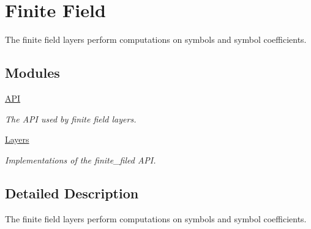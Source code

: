 \hypertarget{group__finite__field}{\section{Finite Field}
\label{group__finite__field}
}


The finite field layers perform computations on symbols and symbol coefficients.  


\subsection*{Modules}
\begin{DoxyCompactItemize}
\item 
\hyperlink{group__finite__field__api}{A\-P\-I}
\begin{DoxyCompactList}\small\item\em The A\-P\-I used by finite field layers. \end{DoxyCompactList}\item 
\hyperlink{group__finite__field__layers}{Layers}
\begin{DoxyCompactList}\small\item\em Implementations of the finite\-\_\-filed A\-P\-I. \end{DoxyCompactList}\end{DoxyCompactItemize}


\subsection{Detailed Description}
The finite field layers perform computations on symbols and symbol coefficients. 